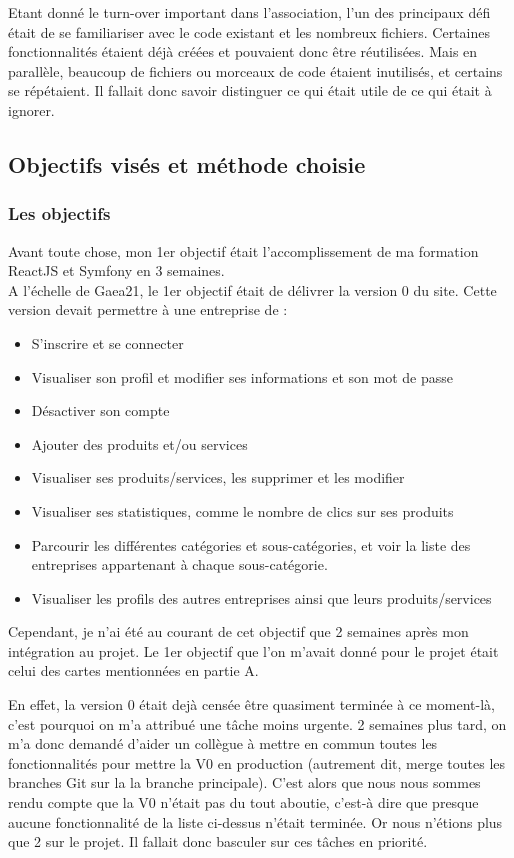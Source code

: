 Etant donné le turn-over important dans l'association, l'un des principaux défi était de se familiariser avec le code existant et les nombreux fichiers. 
Certaines fonctionnalités étaient déjà créées et pouvaient donc être réutilisées. Mais en parallèle, beaucoup de fichiers ou morceaux de code étaient inutilisés, et certains se répétaient. 
Il fallait donc savoir distinguer ce qui était utile de ce qui était à ignorer.

\pagebreak
\subsection{Objectifs visés et méthode choisie}

\subsubsection{Les objectifs}

Avant toute chose, mon 1er objectif était l'accomplissement de ma formation ReactJS et Symfony en 3 semaines.
\\
A l'échelle de Gaea21, le 1er objectif était de délivrer la version 0 du site. 
Cette version devait permettre à une entreprise de : 

\begin{itemize}
    \item S'inscrire et se connecter
    \item Visualiser son profil et modifier ses informations et son mot de passe
    \item Désactiver son compte
    \item Ajouter des produits et/ou services
    \item Visualiser ses produits/services, les supprimer et les modifier
    \item Visualiser ses statistiques, comme le nombre de clics sur ses produits
    \item Parcourir les différentes catégories et sous-catégories, et voir la liste des entreprises appartenant à chaque sous-catégorie.
    \item Visualiser les profils des autres entreprises ainsi que leurs produits/services
\end{itemize}

Cependant, je n'ai été au courant de cet objectif que 2 semaines après mon intégration au projet. 
Le 1er objectif que l'on m'avait donné pour le projet était celui des cartes mentionnées en partie A. 

En effet, la version 0 était dejà censée être quasiment terminée à ce moment-là, c'est pourquoi on m'a attribué une tâche moins urgente. 
2 semaines plus tard, on m'a donc demandé d'aider un collègue à mettre en commun toutes les fonctionnalités pour mettre la V0 en production 
(autrement dit, merge toutes les branches Git sur la la branche principale).
C'est alors que nous nous sommes rendu compte que la V0 n'était pas du tout aboutie, c'est-à dire que presque aucune fonctionnalité de la liste ci-dessus n'était terminée. 
Or nous n'étions plus que 2 sur le projet. Il fallait donc basculer sur ces tâches en priorité.

